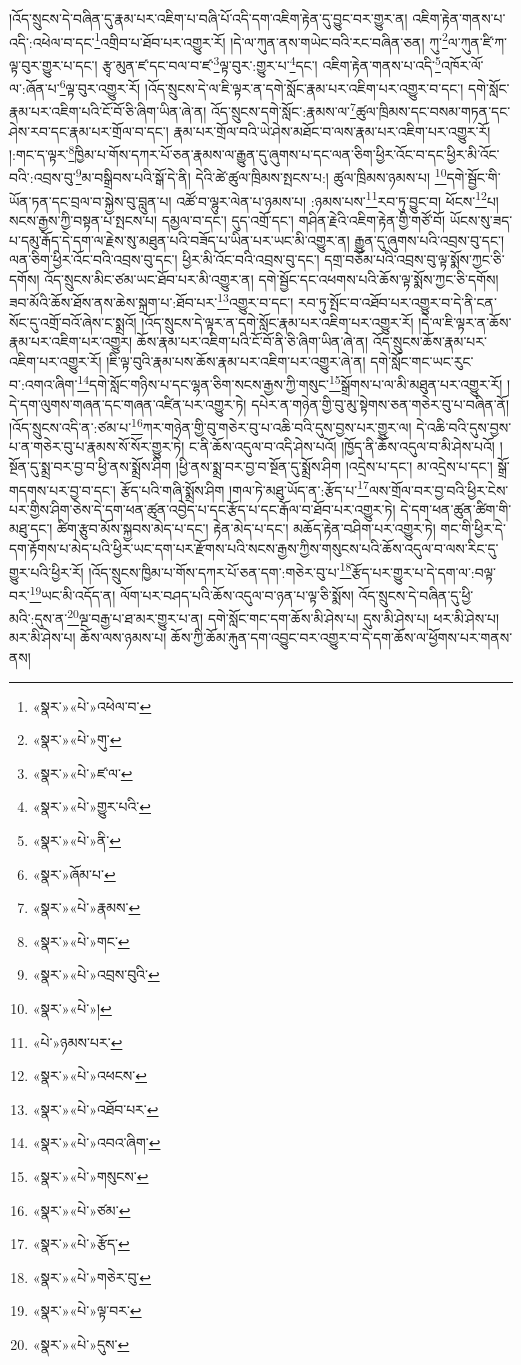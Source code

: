 །འོད་སྲུངས་དེ་བཞིན་དུ་རྣམ་པར་འཇིག་པ་བཞི་པོ་འདི་དག་འཇིག་རྟེན་དུ་བྱུང་བར་གྱུར་ན། འཇིག་རྟེན་གནས་པ་འདི་:འཕེལ་བ་དང་\footnote{«སྣར་»«པེ་»འཕེལ་བ་}འགྲིབ་པ་ཐོབ་པར་འགྱུར་རོ། །དེ་ལ་ཀུན་ནས་གཡེང་བའི་རང་བཞིན་ཅན། ཀུ་\footnote{«སྣར་»«པེ་»གུ་}ལ་ཀུན་ཛི་ཀ་ལྟ་བུར་གྱུར་པ་དང་། རྩྭ་མུན་ཛ་དང་བལ་བ་ཛ་\footnote{«སྣར་»«པེ་»ཛ་ལ་}ལྟ་བུར་:གྱུར་པ་\footnote{«སྣར་»«པེ་»གྱུར་པའི་}དང་། འཇིག་རྟེན་གནས་པ་འདི་\footnote{«སྣར་»«པེ་»ནི་}འཁོར་ལོ་ལ་:ཞོན་པ་\footnote{«སྣར་»ཞོམ་པ་}ལྟ་བུར་འགྱུར་རོ། །འོད་སྲུངས་དེ་ལ་ཇི་ལྟར་ན་དགེ་སློང་རྣམ་པར་འཇིག་པར་འགྱུར་བ་དང་། དགེ་སློང་རྣམ་པར་འཇིག་པའི་ངོ་བོ་ཅི་ཞིག་ཡིན་ཞེ་ན། འོད་སྲུངས་དགེ་སློང་:རྣམས་ལ་\footnote{«སྣར་»«པེ་»རྣམས་}ཚུལ་ཁྲིམས་དང་བསམ་གཏན་དང་ཤེས་རབ་དང་རྣམ་པར་གྲོལ་བ་དང་། རྣམ་པར་གྲོལ་བའི་ཡེ་ཤེས་མཐོང་བ་ལས་རྣམ་པར་འཇིག་པར་འགྱུར་རོ། །:གང་ད་ལྟར་\footnote{«སྣར་»«པེ་»གང་}ཁྱིམ་པ་གོས་དཀར་པོ་ཅན་རྣམས་ལ་རྒྱུན་དུ་ཞུགས་པ་དང་ལན་ཅིག་ཕྱིར་འོང་བ་དང་ཕྱིར་མི་འོང་བའི་:འབྲས་བུ་\footnote{«སྣར་»«པེ་»འབྲས་བུའི་}མ་བསྒྲིབས་པའི་སྒོ་དེ་ནི། དེའི་ཚེ་ཚུལ་ཁྲིམས་སྤངས་པ:། ཚུལ་ཁྲིམས་ཉམས་པ། \footnote{«སྣར་»«པེ་»།  }དགེ་སྦྱོང་གི་ཡོན་ཏན་དང་བྲལ་བ་སྐྱེས་བུ་བླུན་པ། འཚོ་བ་ལྷུར་ལེན་པ་ཉམས་པ། :ཉམས་པས་\footnote{«པེ་»ཉམས་པར་}རབ་ཏུ་བྱུང་བ། ཕོངས་\footnote{«སྣར་»«པེ་»འཕངས་}པ། སངས་རྒྱས་ཀྱི་བསྟན་པ་སྤངས་པ། དམྱལ་བ་དང་། དུད་འགྲོ་དང་། གཤིན་རྗེའི་འཇིག་རྟེན་གྱི་གཙོ་བོ། ཡོངས་སུ་ཟད་པ་དམུ་རྒོད་དེ་དག་ལ་རྗེས་སུ་མཐུན་པའི་བཟོད་པ་ཡིན་པར་ཡང་མི་འགྱུར་ན། རྒྱུན་དུ་ཞུགས་པའི་འབྲས་བུ་དང་། ལན་ཅིག་ཕྱིར་འོང་བའི་འབྲས་བུ་དང་། ཕྱིར་མི་འོང་བའི་འབྲས་བུ་དང་། དགྲ་བཅོམ་པའི་འབྲས་བུ་ལྟ་སྨོས་ཀྱང་ཅི་དགོས། འོད་སྲུངས་མིང་ཙམ་ཡང་ཐོབ་པར་མི་འགྱུར་ན། དགེ་སྦྱོང་དང་འཕགས་པའི་ཆོས་ལྟ་སྨོས་ཀྱང་ཅི་དགོས། ཟབ་མོའི་ཆོས་ཐོས་ནས་ཆེས་སྐྲག་པ་:ཐོབ་པར་\footnote{«སྣར་»«པེ་»འཐོབ་པར་}འགྱུར་བ་དང་། རབ་ཏུ་སྤོང་བ་འཐོབ་པར་འགྱུར་བ་དེ་ནི་ངན་སོང་དུ་འགྲོ་བའོ་ཞེས་ང་སྨྲའོ། །འོད་སྲུངས་དེ་ལྟར་ན་དགེ་སློང་རྣམ་པར་འཇིག་པར་འགྱུར་རོ། །དེ་ལ་ཇི་ལྟར་ན་ཆོས་རྣམ་པར་འཇིག་པར་འགྱུར། ཆོས་རྣམ་པར་འཇིག་པའི་ངོ་བོ་ནི་ཅི་ཞིག་ཡིན་ཞེ་ན། འོད་སྲུངས་ཆོས་རྣམ་པར་འཇིག་པར་འགྱུར་རོ། །ཇི་ལྟ་བུའི་རྣམ་པས་ཆོས་རྣམ་པར་འཇིག་པར་འགྱུར་ཞེ་ན། དགེ་སློང་གང་ཡང་རུང་བ་:འགའ་ཞིག་\footnote{«སྣར་»«པེ་»འབའ་ཞིག་}དགེ་སློང་གཉིས་པ་དང་ལྷན་ཅིག་སངས་རྒྱས་ཀྱི་གསུང་\footnote{«སྣར་»«པེ་»གསུངས་}སྒྲོགས་པ་ལ་མི་མཐུན་པར་འགྱུར་རོ། །དེ་དག་ལུགས་གཞན་དང་གཞན་འཛིན་པར་འགྱུར་ཏེ། དཔེར་ན་གཉེན་གྱི་བུ་མུ་སྟེགས་ཅན་གཅེར་བུ་པ་བཞིན་ནོ། །འོད་སྲུངས་འདི་ན་:ཙམ་པ་\footnote{«སྣར་»«པེ་»ཙམ་}ཀར་གཉེན་གྱི་བུ་གཅེར་བུ་པ་འཆི་བའི་དུས་བྱས་པར་གྱུར་ལ། དེ་འཆི་བའི་དུས་བྱས་པ་ན་གཅེར་བུ་པ་རྣམས་སོ་སོར་གྱུར་ཏེ། ང་ནི་ཆོས་འདུལ་བ་འདི་ཤེས་པའོ། །ཁྱོད་ནི་ཆོས་འདུལ་བ་མི་ཤེས་པའོ། །སྔོན་དུ་སྨྲ་བར་བྱ་བ་ཕྱི་ནས་སྨྲོས་ཤིག །ཕྱི་ནས་སྨྲ་བར་བྱ་བ་སྔོན་དུ་སྨྲོས་ཤིག །འདྲེས་པ་དང་། མ་འདྲེས་པ་དང་། སྒྲོ་གདགས་པར་བྱ་བ་དང་། རྩོད་པའི་གཞི་སྨྲོས་ཤིག །གལ་ཏེ་མཐུ་ཡོད་ན་:རྩོད་པ་\footnote{«སྣར་»«པེ་»རྩོད་}ལས་གྲོལ་བར་བྱ་བའི་ཕྱིར་ངེས་པར་གྱིས་ཤིག་ཅེས་དེ་དག་ཕན་ཚུན་འབྱེད་པ་དང་རྩོད་པ་དང་རྒོལ་བ་ཐོབ་པར་འགྱུར་ཏེ། དེ་དག་ཕན་ཚུན་ཚིག་གི་མཐུ་དང་། ཚིག་རྩུབ་མོས་སྐྱབས་མེད་པ་དང་། རྟེན་མེད་པ་དང་། མཆོད་རྟེན་བཤིག་པར་འགྱུར་ཏེ། གང་གི་ཕྱིར་དེ་དག་རྟོགས་པ་མེད་པའི་ཕྱིར་ཡང་དག་པར་རྫོགས་པའི་སངས་རྒྱས་ཀྱིས་གསུངས་པའི་ཆོས་འདུལ་བ་ལས་རིང་དུ་གྱུར་པའི་ཕྱིར་རོ། །འོད་སྲུངས་ཁྱིམ་པ་གོས་དཀར་པོ་ཅན་དག་:གཅེར་བུ་པ་\footnote{«སྣར་»«པེ་»གཅེར་བུ་}རྩོད་པར་གྱུར་པ་དེ་དག་ལ་:བལྟ་བར་\footnote{«སྣར་»«པེ་»ལྟ་བར་}ཡང་མི་འདོད་ན། ལོག་པར་བཤད་པའི་ཆོས་འདུལ་བ་ཉན་པ་ལྟ་ཅི་སྨོས། འོད་སྲུངས་དེ་བཞིན་དུ་ཕྱི་མའི་:དུས་ན་\footnote{«སྣར་»«པེ་»དུས་}ལྔ་བརྒྱ་པ་ཐ་མར་གྱུར་པ་ན། དགེ་སློང་གང་དག་ཆོས་མི་ཤེས་པ། དུས་མི་ཤེས་པ། ཕར་མི་ཤེས་པ། མར་མི་ཤེས་པ། ཆོས་ལས་ཉམས་པ། ཆོས་ཀྱི་ཆོམ་རྐུན་དག་འབྱུང་བར་འགྱུར་བ་དེ་དག་ཆོས་ལ་ཕྱོགས་པར་གནས་ནས། 